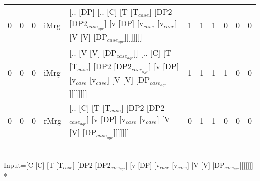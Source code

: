 \begin{tabularx}{\linewidth}{rrrlXrrrrrr}
   0 &       0 &   0 & iMrg & [.. [DP] [.. [C] [T [T$_{case}$] [DP2 [DP2$_{case_{agr}}$] [v [DP] [v$_{case}$ [v$_{case}$] [V [V] [DP$_{case_{agr}}$]]]]]]]]                                                                               &            1 &             1 &             1 &                  0 &              0 &              0 \\
   0 &       0 &   0 & iMrg & [.. [V [V] [DP$_{case_{agr}}$]] [.. [C] [T [T$_{case}$] [DP2 [DP2$_{case_{agr}}$] [v [DP] [v$_{case}$ [v$_{case}$] [V [V] [DP$_{case_{agr}}$]]]]]]]]                                                              &            1 &             1 &             1 &                  1 &              0 &              0 \\
   0 &       0 &   0 & rMrg & [.. [C] [T [T$_{case}$] [DP2 [DP2$_{case_{agr}}$] [v [DP] [v$_{case}$ [v$_{case}$] [V [V] [DP$_{case_{agr}}$]]]]]]]                                                                                         &            0 &             1 &             1 &                  0 &              0 &              0 \\
\hline
\end{tabularx}\endgroup\\
\begingroup\scriptsize Input=[C [C] [T [T$_{case}$] [DP2 [DP2$_{case_{agr}}$] [v [DP] [v$_{case}$ [v$_{case}$] [V [V] [DP$_{case_{agr}}$]]]]]]]\\*
